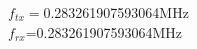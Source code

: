 \documentclass[preview]{standalone}
\begin{document}
\begin{center}
$f_{tx}=$0.283261907593064MHz\\$f_{rx}$=0.283261907593064MHz
\end{center}
\end{document}
